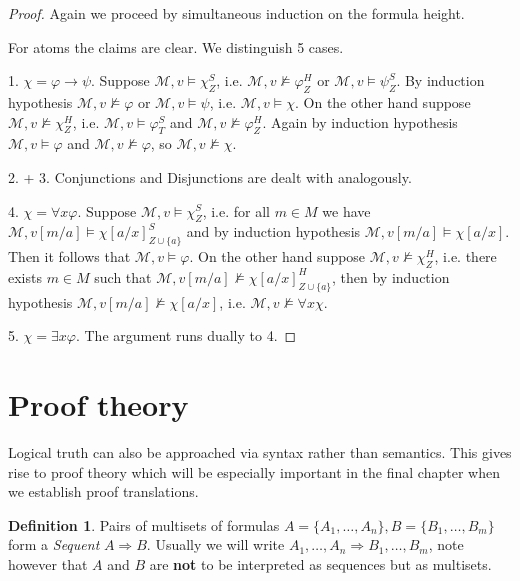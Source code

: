\documentclass[a4paper,11pt]{report}
\theoremstyle{definition}
\theoremstyle{definition}
\theoremstyle{definition}
\theoremstyle{definition}
\theoremstyle{definition}
\newtheorem{definition}[theorem]{Definition}
\theoremstyle{definition}
\theoremstyle{definition}
\begin{document}
	\begin{proof}
		Again we proceed by simultaneous induction on the formula height.
		
		For atoms the claims are clear. We distinguish 5 cases.
		
		1. $\chi = \varphi\to\psi$. Suppose $\mathcal M, v\models\chi^S_Z$, i.e. $\mathcal M, v\not\models\varphi^H_Z$ or $\mathcal M, v\models\psi^S_Z$. By induction hypothesis $\mathcal M, v\not\models \varphi$ or $\mathcal M, v\models\psi$, i.e. $\mathcal M, v\models \chi$. On the other hand suppose $\mathcal M, v\not\models\chi^H_Z$, i.e. $\mathcal M, v\models\varphi^S_T$ and $\mathcal M, v\not\models\varphi^H_Z$. Again by induction hypothesis $\mathcal M,v\models\varphi$ and $\mathcal M, v\not\models \varphi$, so $\mathcal M, v\not\models\chi$.
		
		2. + 3. Conjunctions and Disjunctions are dealt with analogously.
		
		4. $\chi = \forall x\varphi$.  Suppose $\mathcal M, v\models\chi^S_Z$, i.e. for all $m\in M$ we have $\mathcal M, v[m/a]\models \chi[a/x]^S_{Z\cup\{a\}}$ and by induction hypothesis $\mathcal M, v[m/a]\models \chi[a/x]$. Then it follows that $\mathcal M, v\models\varphi$. On the other hand suppose $\mathcal M, v\not\models\chi^H_Z$, i.e. there exists $m\in M$ such that $\mathcal M, v[m/a]\not\models\chi[a/x]^H_{Z\cup \{a\}}$, then by induction hypothesis $\mathcal M, v[m/a]\not\models \chi[a/x]$, i.e. $\mathcal M, v\not\models\forall x\chi$.
		
		5. $\chi = \exists x\varphi$.  The argument runs dually to 4.
	\end{proof}
	
	\section{Proof theory}\label{proof-theory}
	
	Logical truth can also be approached via syntax rather than semantics. This gives rise to proof theory which will be especially important in the final chapter when we establish proof translations.
		
	\begin{definition}
		Pairs of multisets of formulas $A = \{A_1,\dots, A_n\}, B = \{B_1,\dots, B_m\}$ form a \textit{Sequent} $A\Rightarrow B$. Usually we will write $A_1,\dots, A_n\Rightarrow B_1,\dots, B_m$, note however that $A$ and $B$ are \textbf{not} to be interpreted as sequences but as multisets.
	\end{definition}
	
\end{document}
